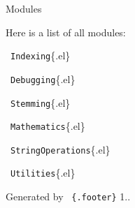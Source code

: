 Modules











Here is a list of all modules\+:







  {\tt Indexing}\{.el\}

  {\tt Debugging}\{.el\}

  {\tt Stemming}\{.el\}

  {\tt Mathematics}\{.el\}

  {\tt String\+Operations}\{.el\}

  {\tt Utilities}\{.el\} 





 



Generated by  {\tt \{.footer\}} 1.. 